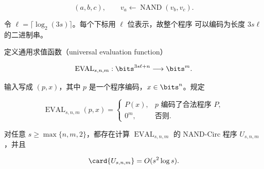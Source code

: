 \[
  (a,b,c),
  \qquad
  v_a\gets\operatorname{NAND}(v_b,v_c).
\]

令 $\ell=\lceil\log_2(3s)\rceil$。每个下标用 $\ell$ 位表示，故整个程序
可以编码为长度 $3s\ell$ 的二进制串。

\begin{example}[通用求值函数]
  \label{ex:universal-evaluation}
  定义通用求值函数（universal evaluation function）

  \[
    \operatorname{EVAL}_{s,n,m}:
    \bits^{3s\ell+n}\longrightarrow\bits^m.
  \]

  输入写成 $(p,x)$，其中 $p$ 是一个程序编码，$x\in\bits^n$。规定

  \[
    \operatorname{EVAL}_{s,n,m}(p,x)=
    \begin{cases}
      P(x), & p\text{ 编码了合法程序 }P,\\
      0^m,  & \text{否则}.
    \end{cases}
  \]
\end{example}

\begin{theorem}
  \label{thm:universal-nand-circ-program}
  对任意 $s\geq\max\{n,m,2\}$，都存在计算
  $\operatorname{EVAL}_{s,n,m}$ 的 NAND-Circ 程序 $U_{s,n,m}$，并且

  \[
    \card{U_{s,n,m}}=O(s^2\log s).
  \]
\end{theorem}

